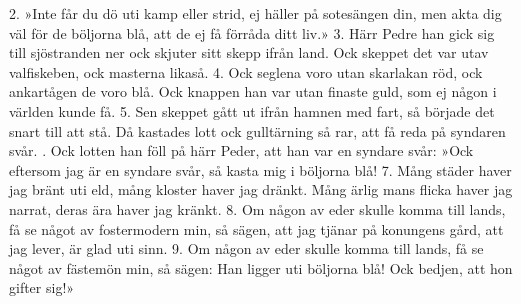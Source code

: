 \setlength{\columnsep}{0.5cm}
\begin{multicols}{2}
2.  »Inte får du dö uti kamp eller strid,
    ej häller på sotesängen din,
    men akta dig väl för de böljorna blå,
    att de ej få förråda ditt liv.»
3.  Härr Pedre han gick sig till sjöstranden ner
    ock skjuter sitt skepp ifrån land.
    Ock skeppet det var utav valfiskeben,
    ock masterna likaså.
4.  Ock seglena voro utan skarlakan röd,
    ock ankartågen de voro blå.
    Ock knappen han var utan finaste guld,
    som ej någon i världen kunde få.
5.  Sen skeppet gått ut ifrån hamnen med fart,
    så började det snart till att stå.
    Då kastades lott ock gulltärning så rar,
    att få reda på syndaren svår.
\vfill{}.  Ock lotten han föll på härr Peder,
    att han var en syndare svår:
    »Ock eftersom jag är en syndare svår,
    så kasta mig i böljorna blå!
7.  Mång städer haver jag bränt uti eld,
    mång kloster haver jag dränkt.
    Mång ärlig mans flicka haver jag narrat,
    deras ära haver jag kränkt.
8.  Om någon av eder skulle komma till lands,
    få se något av fostermodern min,
    så sägen, att jag tjänar på konungens gård,
    att jag lever, är glad uti sinn.
9.  Om någon av eder skulle komma till lands,
    få se något av fästemön min,
    så sägen: Han ligger uti böljorna blå!
    Ock bedjen, att hon gifter sig!»
\end{multicols}
